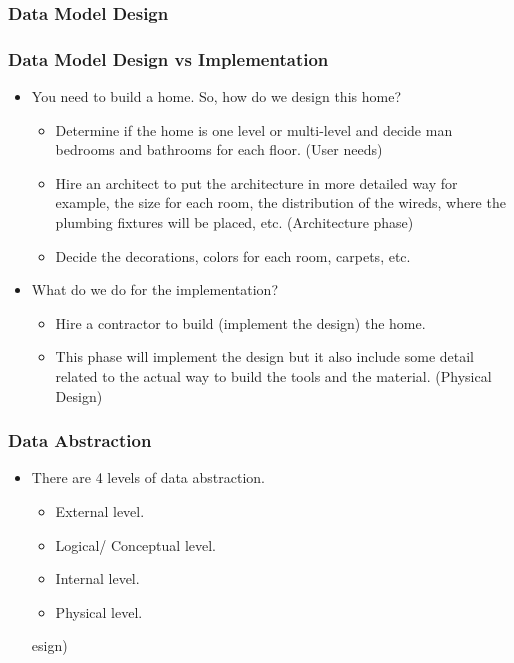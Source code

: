\subsubsection{Data Model Design}
\begin{frame}
\frametitle{Data Model Design vs Implementation}
	\begin{itemize}[<+->]
	\item You need to build a home. So, how do we design this home?
		\begin{itemize}[<+->]
			\item Determine if the home is one level or multi-level and decide man bedrooms and bathrooms for each floor. (User needs)
			\item Hire an architect to put the architecture in more detailed way for example, the size for each room, the distribution of the wireds, where the plumbing fixtures will be placed, etc. (Architecture phase)
			\item Decide the decorations, colors for each room, carpets, etc. 
		\end{itemize}
	\item What do we do for the implementation?
		\begin{itemize}[<+->]
			\item Hire a contractor to build (implement the design) the home. 
			\item This phase will implement the design but it also include some detail related to the actual way to build the tools and the material. (Physical Design)
		\end{itemize}		
	\end{itemize}
\end{frame}

\begin{frame}
\frametitle{Data Abstraction}
\begin{itemize}[<+->]
	\item There are 4 levels of data abstraction.
	\begin{itemize}[<+->]
		\item External level.
		\item Logical/ Conceptual level.
		\item Internal level.
		\item Physical level.
	\end{itemize}esign)
\end{itemize}		
\end{frame}


